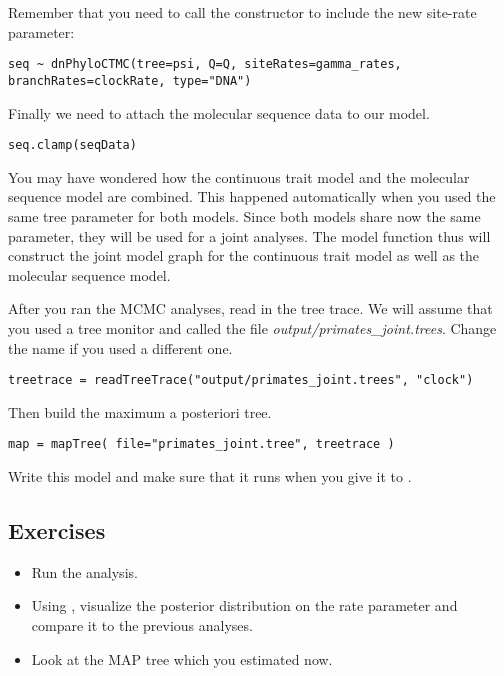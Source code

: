 Remember that you need to call the  constructor to include the new site-rate parameter:
{\tt \begin{snugshade*}
\begin{lstlisting}
seq ~ dnPhyloCTMC(tree=psi, Q=Q, siteRates=gamma_rates, branchRates=clockRate, type="DNA")
\end{lstlisting}
\end{snugshade*}}
Finally we need to attach the molecular sequence data to our model.
{\tt \begin{snugshade*}
\begin{lstlisting}
seq.clamp(seqData)
\end{lstlisting}
\end{snugshade*}}
You may have wondered how the continuous trait model and the molecular sequence model are combined.
This happened automatically when you used the same tree parameter  for both models. 
Since both models share now the same parameter, they will be used for a joint analyses.
The model function thus will construct the joint model graph for the continuous trait model as well as the molecular sequence model.

After you ran the MCMC analyses, read in the tree trace. We will assume that you used a tree monitor and called the file \emph{output/primates\_joint.trees}. Change the name if you used a different one.
{\tt \begin{snugshade*}
\begin{lstlisting}
treetrace = readTreeTrace("output/primates_joint.trees", "clock")
\end{lstlisting}
\end{snugshade*}}
Then build the maximum a posteriori tree.
{\tt \begin{snugshade*}
\begin{lstlisting}
map = mapTree( file="primates_joint.tree", treetrace )
\end{lstlisting}
\end{snugshade*}}


Write this model and make sure that it runs when you give it to \RevBayes.


\subsection*{Exercises}

\begin{itemize}
\item
Run the analysis.
\item
Using , visualize the posterior distribution on the rate parameter  and compare it to the previous analyses.
\item 
Look at the MAP tree which you estimated now.
\end{itemize}

